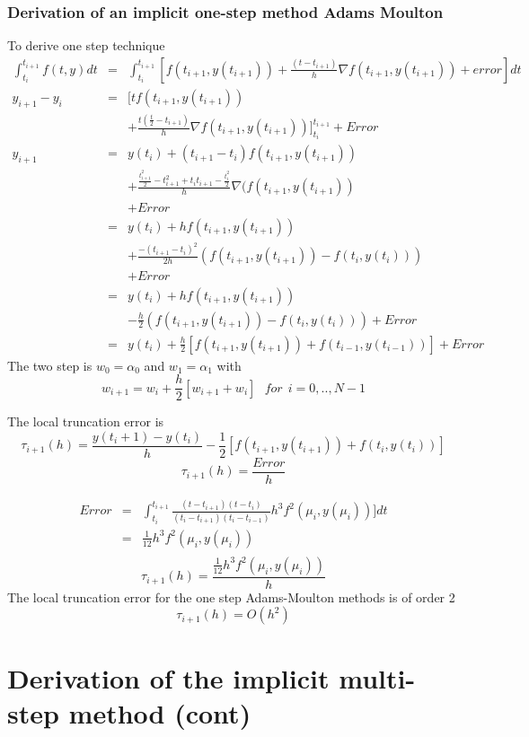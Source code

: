 \subsubsection{Derivation of an implicit one-step method Adams Moulton}
To derive one step  technique
\begin{eqnarray*}
\int_{t_i}^{t_{i+1}} f(t,y)dt &= &\int_{t_{i}}^{t_{i+1}}
[f(t_{i+1},y(t_{i+1}))+\frac{(t-t_{i+1})}{h}
\nabla f(t_{i+1},y(t_{i+1}))+error]dt \\
y_{i+1}-y_i &= &[t f(t_{i+1},y(t_{i+1})) \\
& & +\frac{t(\frac{t}{2}-t_{i+1})}{h}\nabla 
f(t_{i+1},y(t_{i+1}))]_{t_i}^{t_{i+1}}+Error \\
y_{i+1}&=&y(t_i)+ (t_{i+1}-t_i)f(t_{i+1},y(t_{i+1}))\\
& & +\frac{\frac{t_{i+1}^2}{2}-t_{i+1}^2+t_it_{i+1}-\frac{t_i^2}{2}}{h}\nabla(f(t_{i+1},y(t_{i+1}))\\
& & +Error\\
&=&y(t_i)+ hf(t_{i+1},y(t_{i+1}))\\
& & +\frac{-(t_{i+1}-t_i)^2}{2h}(f(t_{i+1},y(t_{i+1}))-f(t_{i},y(t_{i})))\\
& & +Error\\
&=&y(t_i)+ hf(t_{i+1},y(t_{i+1}))\\
& & -\frac{h}{2}(f(t_{i+1},y(t_{i+1}))-f(t_{i},y(t_{i})))+Error\\
&=&y(t_i)+ \frac{h}{2}[f(t_{i+1},y(t_{i+1}))+f(t_{i-1},y(t_{i-1}))]+Error
\end{eqnarray*}
The two step  is $w_0=\alpha_0$ and $w_1=\alpha_1$ with
\[w_{i+1}=w_i+\frac{h}{2}[w_{i+1}+w_{i}] \ \ \ for \ \ i=0,..,N-1 \]

The local truncation error is
\[\tau_{i+1}(h)=\frac{y(t_i+1)-y(t_i)}{h}-\frac{1}{2}[f(t_{i+1},y(t_{i+1}))+f(t_{i},y(t_{i})) ]  \]
\[\tau_{i+1}(h)=\frac{Error}{h}\]

\begin{eqnarray*}
Error &= &\int_{t_i}^{t_{i+1}} \frac{(t-t_{i+1})(t-t_{i})}{(t_{i}-t_{i+1})(t_{i}-t_{i-1})}h^3 f^2(\mu_i,y(\mu_i))]dt \\
&=&\frac{1}{12}h^3f^2(\mu_i,y(\mu_i))\\
\end{eqnarray*}
\[\tau_{i+1}(h)=\frac{\frac{1}{12}h^3f^2(\mu_i,y(\mu_i))}{h}\]
The local truncation error for the one step Adams-Moulton methods is of order 2
\[\tau_{i+1}(h)=O(h^2)\]


\section*{Derivation of the implicit multi-step method (cont)}

